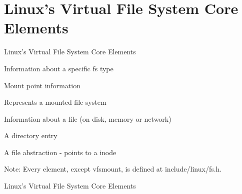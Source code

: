 \documentclass{beamer}
\begin{document}
\section{Linux's Virtual File System Core Elements}

\begin{frame}{Linux's Virtual File System Core Elements}

	\begin{description}[<+->]\itemsep4pt
			
		\item[file\_system\_type]{Information about a specific fs type}
		\item[vfsmount]{Mount point information}		
		\item[super\_block]{Represents a mounted file system}
		\item[inode]{Information about a file (on disk, memory or network)}
		\item[dentry]{A directory entry}
		\item[file]{A file abstraction - points to a inode}

		\vspace{15pt}

		\item{Note: Every element, except vfsmount, is defined at include/linux/fs.h.}

	\end{description}

\end{frame}

\begin{frame}{Linux's Virtual File System Core Elements}
	

\end{frame}
\end{document}
